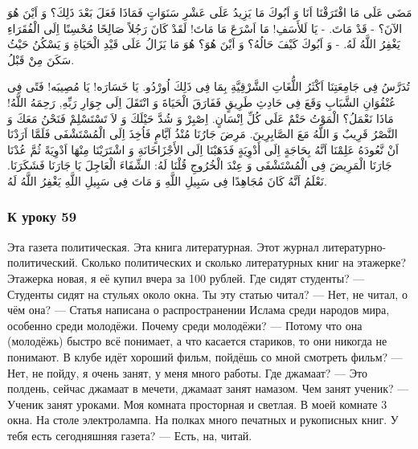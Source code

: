 \documentclass[a5paper]{article}
\begin{document}
مَضَى عَلَى مَا افْتَرَقْنَا اَنَا وَ اَبُوكَ مَا يَزِيدُ عَلَى عَشْرِ سَنَوَاتٍ فَمَاذَا فَعَلَ بَعْدَ ذَلِكَ؟ وَ اَيْنَ هُوَ الآنَ؟ - قَدْ مَاتَ. - يَا لَلأَسَفِ! مَا اَسْرَعَ مَا مَاتَ! لَقَدْ كَانَ رَجُلاً صَالِحًا مُحْسِنًا اِلَى الْفُقَرَاءِ يَغْفِرُ اللَّهُ لَهُ. - وَ اَبُوكَ كَيْفَ حَالُهُ؟ وَ اَيْنَ هُوَ؟ هُوَ مَا يَزَالُ عَلَى قَيْدِ الْحَيَاةِ وَ يَسْكُنُ حَيْثُ سَكَنَ مِنْ قَبْلُ.

تُدَرَّسُ فِى جَامِعَتِنَا اَكْثَرُ اللُّغَاتِ الشَّرْقِيَّةِ بِمَا فِى ذَلِكَ اُورْدُو. يَا خَسَارَه! يَا مُصِيبَه! فَتًى فِى عُنْفُوَانِ الشَّبَابِ وَقَعَ فِى حَادِثِ طَرِيقٍ فَفَارَقَ الْحَيَاةَ وَ انْتَقَلَ اِلَى جِوَارِ رَبِّهِ, رَحِمَهُ اللَّهُ! مَاذَا نَعْمَلُ؟ الْمَوْتُ حَتْمٌ عَلَى كُلِّ اِنْسَانٍ. اِصْبِرْ وَ شُدَّ حَيْلَكَ وَ لاَ تَسْتَسْلِمْ فَنَحْنُ مَعَكَ وَ النَّصْرُ قَرِيبٌ وَ اللَّهُ مَعَ الصَّابِرِينَ. مَرِضَ جَارُنَا مُنْذُ اَيَّامٍ فَاُخِذَ اِلَى الْمُسْتَشْفَى فَلَمَّا اَرَدْنَا اَنْ نَّعُودَهُ عَلِمْنَا اَنَّهُ بِحَاجَةٍ اِلَى أَدْوِيَةٍ فَذَهَبْنَا اِلَى الأَجْزَاخَانَةِ وَ اشْتَرَيْنَا مِنْهَا اَدْوِيَةً ثُمَّ عُدْنَا جَارَنَا الْمَرِيضَ فِى الْمُسْتَشْفَى وَ عِنْدَ الْخُرُوجِ قُلْنَا لَهُ: الشِّفَاءَ الْعَاجِلَ يَا جَارَنَا فَشَكَرَنَا. نَعْلَمُ اَنَّهُ كَانَ مُجَاهِدًا فِى سَبِيلِ اللَّهِ وَ مَاتَ فِى سَبِيلِ اللَّهِ يَغْفِرُ اللَّهُ لَهُ.

\subsubsection{К уроку 59}
Эта газета политическая. Эта книга литературная. Этот журнал литературно-политический. Сколько политических и сколько литера­турных книг на этажерке? Этажерка новая, я её купил вчера за 100 рублей. Где сидят студенты? — Студенты сидят на стульях около окна. Ты эту статью читал? — Нет, не читал, о чём она? — Статья написана о распространении Ислама среди народов мира, особенно среди молодёжи. Почему среди молодёжи? — Потому что она (молодёжь) быстро всё понимает, а что касается стариков, то они никогда не понимают. В клубе идёт хороший фильм, пойдёшь со мной смотреть фильм? — Нет, не пойду, я очень занят, у меня много работы. Где джамаат? — Это полдень, сейчас джамаат в мечети, джамаат занят намазом. Чем занят ученик? — Ученик занят уроками. Моя комната просторная и светлая. В моей комнате 3 окна. На столе электролампа. На полках много печатных и рукописных книг. У тебя есть сегодняшняя газета? — Есть, на, читай.
\end{document}

